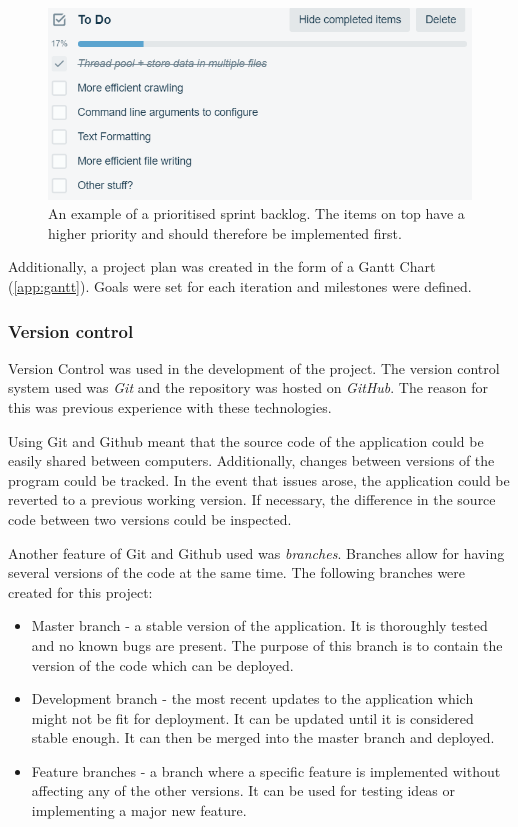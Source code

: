 \documentclass[12pt,a4paper]{article}
\newcommand{\captionstyle}[1] {
    \small{#1}
}
\begin{document}
\begin{figure}[!htb]%
	\centering
	\includegraphics[width=1.0\columnwidth]{backlog}%
	\caption[An example of a prioritsed sprint backlog.]{\captionstyle{An example of a prioritised sprint backlog. The items on top have a higher priority and should therefore be implemented first.}}%
	\label{fig:backlog}%
\end{figure}

Additionally, a project plan was created in the form of a Gantt Chart (\cref{app:gantt}). Goals were set for each iteration and milestones were defined. 

\subsubsection{Version control}
Version Control was used in the development of the project. The version control system used was \textit{Git} and the repository was hosted on \textit{GitHub}. The reason for this was previous experience with these technologies. 

Using Git and Github meant that the source code of the application could be easily shared between computers. Additionally, changes between versions of the program could be tracked. In the event that issues arose, the application could be reverted to a previous working version. If necessary, the difference in the source code between two versions could be inspected.

Another feature of Git and Github used was \textit{branches}. Branches allow for having several versions of the code at the same time. The following branches were created for this project:
\begin{itemize}
	\item Master branch - a stable version of the application. It is thoroughly tested and no known bugs are present. The purpose of this branch is to contain the version of the code which can be deployed.
	\item Development branch - the most recent updates to the application which might not be fit for deployment. It can be updated until it is considered stable enough. It can then be merged into the master branch and deployed.
	\item Feature branches - a branch where a specific feature is implemented without affecting any of the other versions. It can be used for testing ideas or implementing a major new feature.
\end{itemize}
\end{document}
